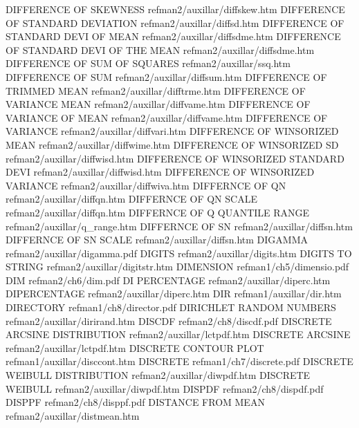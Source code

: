 DIFFERENCE OF SKEWNESS                  refman2/auxillar/diffskew.htm
DIFFERENCE OF STANDARD DEVIATION        refman2/auxillar/diffsd.htm
DIFFERENCE OF STANDARD DEVI OF MEAN     refman2/auxillar/diffsdme.htm
DIFFERENCE OF STANDARD DEVI OF THE MEAN refman2/auxillar/diffsdme.htm
DIFFERENCE OF SUM OF SQUARES            refman2/auxillar/ssq.htm
DIFFERENCE OF SUM                       refman2/auxillar/diffsum.htm
DIFFERENCE OF TRIMMED MEAN              refman2/auxillar/difftrme.htm
DIFFERENCE OF VARIANCE MEAN             refman2/auxillar/diffvame.htm
DIFFERENCE OF VARIANCE OF MEAN          refman2/auxillar/diffvame.htm
DIFFERENCE OF VARIANCE                  refman2/auxillar/diffvari.htm
DIFFERENCE OF WINSORIZED MEAN           refman2/auxillar/diffwime.htm
DIFFERENCE OF WINSORIZED SD             refman2/auxillar/diffwisd.htm
DIFFERENCE OF WINSORIZED STANDARD DEVI  refman2/auxillar/diffwisd.htm
DIFFERENCE OF WINSORIZED VARIANCE       refman2/auxillar/diffwiva.htm
DIFFERNCE OF QN                         refman2/auxillar/diffqn.htm
DIFFERNCE OF QN SCALE                   refman2/auxillar/diffqn.htm
DIFFERNCE OF Q QUANTILE RANGE           refman2/auxillar/q_range.htm
DIFFERNCE OF SN                         refman2/auxillar/diffsn.htm
DIFFERNCE OF SN SCALE                   refman2/auxillar/diffsn.htm
DIGAMMA                                 refman2/auxillar/digamma.pdf
DIGITS                                  refman2/auxillar/digits.htm
DIGITS TO STRING                        refman2/auxillar/digitstr.htm
DIMENSION                               refman1/ch5/dimensio.pdf
DIM                                     refman2/ch6/dim.pdf
DI PERCENTAGE                           refman2/auxillar/diperc.htm
DIPERCENTAGE                            refman2/auxillar/diperc.htm
DIR                                     refman1/auxillar/dir.htm
DIRECTORY                               refman1/ch8/director.pdf
DIRICHLET RANDOM NUMBERS                refman2/auxillar/dirirand.htm
DISCDF                                  refman2/ch8/discdf.pdf
DISCRETE ARCSINE DISTRIBUTION           refman2/auxillar/lctpdf.htm
DISCRETE ARCSINE                        refman2/auxillar/lctpdf.htm
DISCRETE CONTOUR PLOT                   refman1/auxillar/disccont.htm
DISCRETE                                refman1/ch7/discrete.pdf
DISCRETE WEIBULL DISTRIBUTION           refman2/auxillar/diwpdf.htm
DISCRETE WEIBULL                        refman2/auxillar/diwpdf.htm
DISPDF                                  refman2/ch8/dispdf.pdf
DISPPF                                  refman2/ch8/disppf.pdf
DISTANCE FROM MEAN                      refman2/auxillar/distmean.htm
